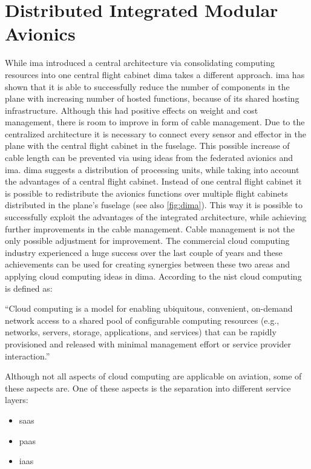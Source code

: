 \documentclass[titlepage]{report}
\begin{document}
\section{Distributed Integrated Modular Avionics}\label{section:distributed_integrated_modular_avionics}
While \gls{ima} introduced a central architecture via consolidating computing resources into one central flight cabinet
\gls{dima} takes a different approach. \gls{ima} has shown that it is able to successfully reduce the number of components
in the plane with increasing number of hosted functions, because of its shared hosting infrastructure\cite{fuchsen2009preparing}.
Although this had positive effects on weight and cost management, there is room to improve in form of cable management.
Due to the centralized architecture it is necessary to connect every sensor and effector in the plane with the central flight cabinet
in the fuselage\cite{mccabe2009avionics}. This possible increase of cable length can be prevented via using ideas from the federated avionics and \gls{ima}.
\gls{dima} suggests a distribution of processing units, while taking into account the advantages of a central flight cabinet.
Instead of one central flight cabinet it is possible to redistribute the avionics functions over multiple flight cabinets distributed
in the plane's fuselage (see also \autoref{fig:dima}). This way it is possible to successfully exploit the advantages of the integrated architecture, while achieving
further improvements in the cable management\cite{li2012avionics}. Cable management is not the only possible adjustment for improvement.
The commercial cloud computing industry experienced a huge success over the last couple of years and these achievements can be used
for creating synergies between these two areas and applying cloud computing ideas in \gls{dima}. According to the \gls{nist} cloud computing is defined as:
\begin{displayquote}
\enquote{Cloud computing is a model for enabling ubiquitous, convenient, on-demand network access to a shared
pool of configurable computing resources (e.g., networks, servers, storage, applications, and services) that
can be rapidly provisioned and released with minimal management effort or service provider interaction.}\cite{mell2011sp}
\end{displayquote}
Although not all aspects of cloud computing are applicable on aviation, some of these aspects are.
One of these aspects is the separation into different service layers:
\begin{itemize}
    \item \gls{saas}
    \item \gls{paas}
    \item \gls{iaas}
\end{itemize}
\end{document}
